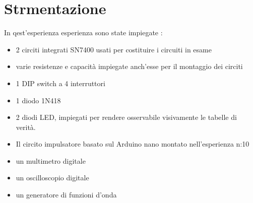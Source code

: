 \section{Strmentazione}
	In qest'esperienza esperienza sono state impiegate :
	\begin{itemize}
		\item 2 circiti integrati SN7400 usati per costituire i circuiti in esame
		\item varie resistenze e capacità impiegate anch'esse per il montaggio dei circiti
		\item 1 DIP switch a 4 interruttori
		\item 1 diodo 1N418
		\item 2 diodi LED, impiegati per rendere osservabile visivamente le tabelle di verità. 
		\item Il circito impulsatore basato sul Arduino nano montato nell'esperienza n:10
		\item un multimetro digitale
		\item un oscilloscopio digitale 
		\item un generatore di funzioni d'onda
	\end{itemize}
